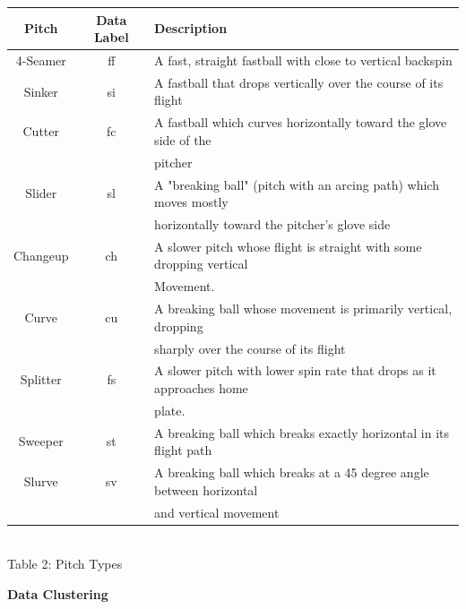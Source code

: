 \documentclass[12 pt]{article}
\begin{document}
\begin{center}
    \begin{tabular}{||c | c | l||} 
     \hline
     Pitch & Data Label & Description  \\ [0.5ex] 
     \hline
     4-Seamer & ff & A fast, straight fastball with close to vertical backspin \\
     \hline
     Sinker & si & A fastball that drops vertically over the course of its flight \\
     \hline
     Cutter & fc & A fastball which curves horizontally toward the glove side of the\\
     && pitcher\\
     \hline
     Slider & sl & A "breaking ball" (pitch with an arcing path) which moves mostly 
     \\ && horizontally toward the pitcher's glove side\\
     \hline
     Changeup & ch & A slower pitch whose flight is straight with some dropping vertical\\ 
     && Movement.\\
     \hline 
     Curve & cu & A breaking ball whose movement is primarily vertical, dropping\\
     && sharply over the course of its flight \\
     \hline 
     Splitter & fs & A slower pitch with lower spin rate that drops as it approaches home \\
     && plate.\\
     \hline
     Sweeper & st & A breaking ball which breaks exactly horizontal in its flight path \\
     \hline 
     Slurve & sv & A breaking ball which breaks at a 45 degree angle between horizontal 
     \\ && and vertical movement \\
     \hline
    \end{tabular}
    \newline \\ Table 2: Pitch Types
\end{center}

\textbf{Data Clustering}
\end{document}
